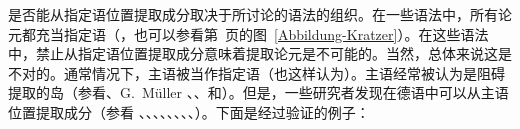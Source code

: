     是否能从指定语位置提取成分取决于所讨论的语法的组织。在一些语法中，所有论元都充当指定语（\citealp[--123]{Kratzer96a}，也可以参看第~\pageref{Abbildung-Kratzer}页的图~\ref{Abbildung-Kratzer}）。在这些语法中，禁止从指定语位置提取成分意味着提取论元是不可能的。当然，总体来说这是不对的。通常情况下，主语被当作指定语（\citealp[]{FG2002a}也这样认为）。主语经常被认为是阻碍提取的岛（参看\citealp[, ]{Grewendorf89a}、G.\ Müller \citeyear[]{GMueller96b}、\citeyear[, ]{GMueller98a}、\citealp[]{Sabel99a}和\citealp[]{Fanselow2001a}）。但是，一些\label{page-extraction-out-of-subjects}研究者发现在德语中可以从主语位置提取成分（参看 \citealp[]{Duerscheid89a}、\citealp*[]{Haider93a}、\citealp{Pafel93b-u}、\citealp[]{Fortmann96a-u}、\citealp[]{Suchsland97a}、\citealp[]{VS98a}、\citealp[]{Ballweg97a}、\citealp[--101]{Mueller99a}、\citealp[]{deKuthy2002a}）。下面是经过验证的例子：
%
